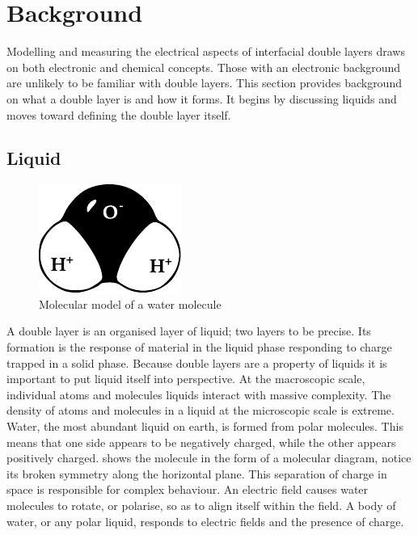 \section{Background}


  Modelling and measuring the electrical aspects of interfacial double layers draws on both electronic and chemical concepts.
  Those with an electronic background are unlikely to be familiar with double layers.
  This section provides background on what a double layer is and how it forms.
  It begins by discussing liquids and moves toward defining the double layer itself.


  \subsection{Liquid}
  
    \begin{figure}
        \begin{center}
            \includegraphics{content/introduction/graphics/polarWater}
        \end{center}
        \caption{Molecular model of a water molecule}
        \label{fig:waterMolecule}
    \end{figure}
    A double layer is an organised layer of liquid; two layers to be precise.
    Its formation is the response of material in the liquid phase responding to charge trapped in a solid phase.
    Because double layers are a property of liquids it is important to put liquid itself into perspective.
    At the macroscopic scale, individual atoms and molecules liquids interact with massive complexity.
    The density of atoms and molecules in a liquid at the microscopic scale is extreme.
    Water, the most abundant liquid on earth, is formed from polar molecules.
    This means that one side appears to be negatively charged, while the other appears positively charged.
     shows the molecule in the form of a molecular diagram, notice its broken symmetry along the horizontal plane.
    This separation of charge in space is responsible for complex behaviour.
    An electric field causes water molecules to rotate, or polarise, so as to align itself within the field.
    A body of water, or any polar liquid, responds to electric fields and the presence of charge.

